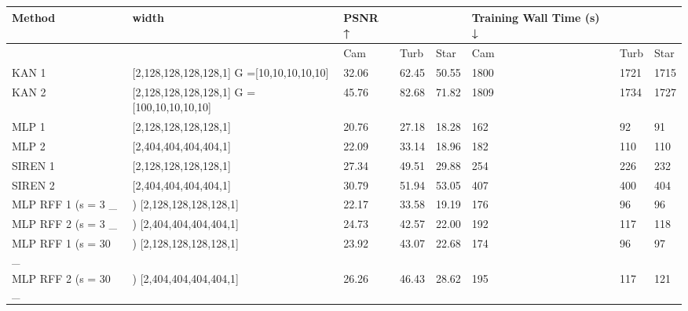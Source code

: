 \begin{tabular}{llllllll}
\toprule
Method & width & PSNR ↑ &  &  & Training Wall Time (s) ↓ &  &  \\
\midrule
 &  & Cam & Turb & Star & Cam & Turb & Star \\
KAN 1 & [2,128,128,128,128,1] G =[10,10,10,10,10] & 32.06 & 62.45 & 50.55 & 1800 & 1721 & 1715 \\
KAN 2 & [2,128,128,128,128,1] G =[100,10,10,10,10] & 45.76 & 82.68 & 71.82 & 1809 & 1734 & 1727 \\
MLP 1 & [2,128,128,128,128,1] & 20.76 & 27.18 & 18.28 & 162 & 92 & 91 \\
MLP 2 & [2,404,404,404,404,1] & 22.09 & 33.14 & 18.96 & 182 & 110 & 110 \\
SIREN 1 & [2,128,128,128,128,1] & 27.34 & 49.51 & 29.88 & 254 & 226 & 232 \\
SIREN 2 & [2,404,404,404,404,1] & 30.79 & 51.94 & 53.05 & 407 & 400 & 404 \\
MLP RFF 1 (s = 3 \_ & ) [2,128,128,128,128,1] & 22.17 & 33.58 & 19.19 & 176 & 96 & 96 \\
MLP RFF 2 (s = 3 \_ & ) [2,404,404,404,404,1] & 24.73 & 42.57 & 22.00 & 192 & 117 & 118 \\
MLP RFF 1 (s = 30 \_ & ) [2,128,128,128,128,1] & 23.92 & 43.07 & 22.68 & 174 & 96 & 97 \\
MLP RFF 2 (s = 30 \_ & ) [2,404,404,404,404,1] & 26.26 & 46.43 & 28.62 & 195 & 117 & 121 \\
\bottomrule
\end{tabular}
